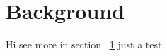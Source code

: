 \section{Background}\label{ch1:sec1:background}
Hi \cite{Bedlinskiy2014} see more in section ~\ref{ch1:sec1:background}
just a test


